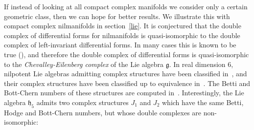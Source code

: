 \documentclass[leqno]{article}
\theoremstyle{definition}
\numberwithin{equation}{section}
\begin{document}
If instead of looking at all compact complex manifolds we consider only a certain geometric class, then we can hope for better results. We illustrate this with compact complex nilmanifolds in section~\ref{lie}.
It is conjectured that the double complex of differential forms for nilmanifolds 
is quasi-isomorphic to the double complex of left-invariant differential forms. In many cases this is known to be true (\cite{CF}), and therefore the double complex of differential forms 
is quasi-isomorphic to the {\sl Chevalley-Eilenberg complex} of the Lie algebra $\mathfrak{g}$. 
In real dimension $6$, nilpotent Lie algebras admitting complex structures have been classified in~\cite{Sal}, and their complex structures have been classified up to equivalence in~\cite{COUV}. The Betti and Bott-Chern numbers of these structures are computed in~\cite{Ang2}. Interestingly, the Lie algebra $\mathfrak{h}_5$ admits two complex structures $J_1$ and $J_2$ which have the same Betti, Hodge and Bott-Chern numbers, but whose double complexes are non-isomorphic:
\end{document}
